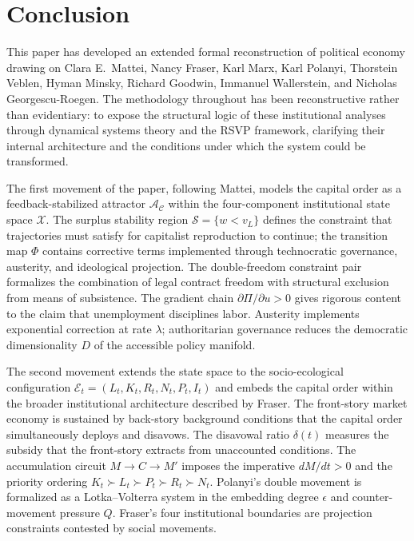 \documentclass[12pt,a4paper]{article}
\theoremstyle{definition}
\theoremstyle{remark}
\begin{document}
\section{Conclusion}
\label{sec:conclusion}

This paper has developed an extended formal reconstruction of political economy drawing on Clara E.\ Mattei, Nancy Fraser, Karl Marx, Karl Polanyi, Thorstein Veblen, Hyman Minsky, Richard Goodwin, Immanuel Wallerstein, and Nicholas Georgescu-Roegen. The methodology throughout has been reconstructive rather than evidentiary: to expose the structural logic of these institutional analyses through dynamical systems theory and the RSVP framework, clarifying their internal architecture and the conditions under which the system could be transformed.

The first movement of the paper, following Mattei, models the capital order as a feedback-stabilized attractor $\mathcal{A}_\mathcal{C}$ within the four-component institutional state space $\mathcal{X}$. The surplus stability region $\mathcal{S} = \{w < v_L\}$ defines the constraint that trajectories must satisfy for capitalist reproduction to continue; the transition map $\Phi$ contains corrective terms implemented through technocratic governance, austerity, and ideological projection. The double-freedom constraint pair formalizes the combination of legal contract freedom with structural exclusion from means of subsistence. The gradient chain $\partial\Pi/\partial u > 0$ gives rigorous content to the claim that unemployment disciplines labor. Austerity implements exponential correction at rate $\lambda$; authoritarian governance reduces the democratic dimensionality $D$ of the accessible policy manifold.

The second movement extends the state space to the socio-ecological configuration $\mathcal{E}_t = (L_t, K_t, R_t, N_t, P_t, I_t)$ and embeds the capital order within the broader institutional architecture described by Fraser. The front-story market economy is sustained by back-story background conditions that the capital order simultaneously deploys and disavows. The disavowal ratio $\delta(t)$ measures the subsidy that the front-story extracts from unaccounted conditions. The accumulation circuit $M \to C \to M'$ imposes the imperative $dM/dt > 0$ and the priority ordering $K_t \succ L_t \succ P_t \succ R_t \succ N_t$. Polanyi's double movement is formalized as a Lotka--Volterra system in the embedding degree $\epsilon$ and counter-movement pressure $Q$. Fraser's four institutional boundaries are projection constraints contested by social movements.
\end{document}
